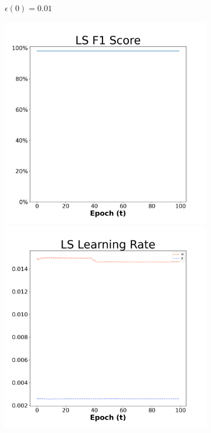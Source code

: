 \begin{figure}[H]
\begin{subfigure}{0.3\textwidth}
  \caption{$\epsilon(0)=0.01$}
\end{subfigure}\hfil %
\begin{subfigure}{0.3\textwidth}
  \includegraphics[width=\linewidth]{images/exper2/breast/LS_0.03_f1.png}
  \includegraphics[width=\linewidth]{images/exper2/breast/LS_0.03_lr.png}

\end{subfigure}
\end{figure}
